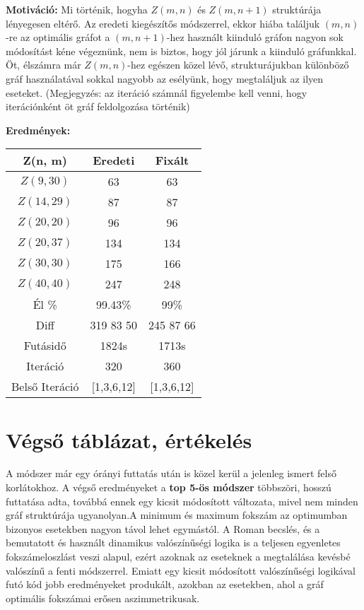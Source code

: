 \documentclass[12pt,a4paper]{article}
\begin{document}
\textbf{Motiváció:} Mi történik, hogyha $Z(m,n)$ és $Z(m,n+1)$ struktúrája lényegesen eltérő. Az eredeti kiegészítős módszerrel, ekkor hiába találjuk $(m,n)$-re az optimális gráfot a $(m,n+1)$-hez használt kiinduló gráfon nagyon sok módosítást kéne végeznünk, nem is biztos, hogy jól járunk a kiinduló gráfunkkal. Öt, élszámra már $Z(m,n)$-hez egészen közel lévő, strukturájukban különböző gráf használatával sokkal nagyobb az esélyünk, hogy megtaláljuk az ilyen eseteket. (Megjegyzés: az iteráció számnál figyelembe kell venni, hogy iterációnként öt gráf feldolgozása történik)

\textbf{Eredmények:}
\begin{table}[H]
\centering
\begin{tabular}{|c|c|c|}
\hline
\textbf{Z(n, m)} & \textbf{Eredeti} & \textbf{Fixált} \\
\hline
$Z(9,30)$  & 63 & 63 \\
$Z(14, 29)$ & 87 & 87 \\
$Z(20, 20)$ & 96 & 96 \\
$Z(20, 37)$ & 134 & 134 \\
$Z(30, 30)$ & 175 & 166 \\
$Z(40, 40)$ & 247 & 248 \\
\hline
Él \% & 99.43\% & 99\% \\
\hline
Diff & 319 83 50 & 245 87 66 \\
\hline
Futásidő & 1824s & 1713s \\
Iteráció & 320 & 360 \\
Belső Iteráció & [1,3,6,12] & [1,3,6,12] \\
\hline
\end{tabular}
\end{table}

\section*{Végső táblázat, értékelés}

A módszer már egy órányi futtatás után is közel kerül a jelenleg ismert felső korlátokhoz. A végső eredményeket a \textbf{top 5-ös módszer} többszöri, hosszú futtatása adta, továbbá ennek egy kicsit módosított változata, mivel nem minden gráf struktúrája ugyanolyan.A minimum és maximum fokszám az optimumban bizonyos esetekben nagyon távol lehet egymástól. A Roman becslés, és a bemutatott és használt dinamikus valószínűségi logika is a teljesen egyenletes fokszámeloszlást veszi alapul, ezért azoknak az eseteknek a megtalálása kevésbé valószínű a fenti módszerrel.
Emiatt egy kicsit módosított valószínűségi logikával futó kód jobb eredményeket produkált, azokban az esetekben, ahol a gráf optimális fokszámai erősen aszimmetrikusak.
\end{document}
